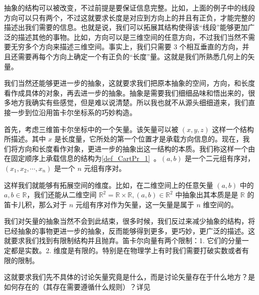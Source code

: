 抽象的结构可以被改变，不过前提是要保证信息完整。比如，上面的例子中的线段方向可以只有两个，不过这就要求长度是对应到方向上的并且有正负，才能完整的描述出我们需要的信息。也就是说，我们可以拓展其结构使得该“线段”能够更加广泛的描述其他的事物。比如，方向可以是三维空间的任意方向，不过我们当然不需要无穷多个方向来描述三维空间。事实上，我们只需要 $3$ 个相互垂直的方向，并且还需要再每个方向上确定一个有正负的“长度”量。这就是我们所熟悉几何上的矢量。

我们当然还能够更进一步的抽象，这就要求我们把原本抽象的空间，方向，和长度看作成具体的对象，再去进一步的抽象。抽象是需要我们细细品味和悟出来的，很多地方我确实有些感觉，但是难以说清楚。所以我也就不从源头细细道来，我们直接一步到位沿用笛卡尔坐标系的巧妙构造。

首先，考虑三维笛卡尔坐标中的一个矢量。该矢量可以被 $(x,y,z)$ 这样一个结构所描述。其中 $x$ 是长度量，它所处的第一个位置才是承载方向信息的。现在，我们将方向和长度看作对象，更进一步的抽象出这一结构的本质。我们称这样一个由在固定顺序上承载信息的结构为\autoref{def_CartPr_1}~。$(a,b)$ 是一个二元组有序对，$(x_1,x_2,\cdots,x_n)$ 是一个 $n$ 元组有序对。

这样我们就能够有拓展空间的维度。比如，在二维空间上的任意矢量 $(a,b)$ 中的 $a,b\in \mathbb R$，我们还能从二维空间 $\mathbb R^2 = \mathbb R\times \mathbb R,(a,b)\in \mathbb R^2$ 中抽象出其本质是是 $\mathbb R$ 的笛卡儿积，那么对于 $n$ 元组有序对作为矢量，这一矢量是属于 $n$ 维空间的。

我们对矢量的抽象当然不会到此结束，很多时候，我们反过来减少抽象的结构，将已经抽象的事物更进一步的抽象，反而能够得到更多，更巧妙，更广泛的描述。这就要求我们找到有限制结构并且抛弃。笛卡尔向量有两个限制：1. 它们的分量一定都是实数。2. 维度是有限的。特别是在物理学上有时我们需要打破实数或者有限的限制。

这就要求我们先不具体的讨论矢量究竟是什么，而是讨论矢量存在于什么地方？是如何存在的（其存在需要遵循什么规则）？详见
